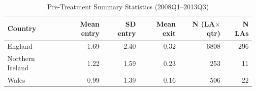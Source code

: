 \begin{table}[!h]
\centering
\caption{\label{tab:summary}Pre-Treatment Summary Statistics (2008Q1--2013Q3)}
\centering
\small
\begin{tabular}[t]{lrrrrr}
\toprule
Country & Mean entry & SD entry & Mean exit & N (LA$\times$qtr) & N LAs\\
\midrule
England & 1.69 & 2.40 & 0.32 & 6808 & 296\\
Northern Ireland & 1.22 & 1.59 & 0.23 & 253 & 11\\
Wales & 0.99 & 1.39 & 0.16 & 506 & 22\\
\bottomrule
\end{tabular}
\end{table}
